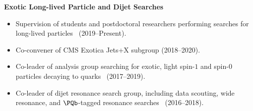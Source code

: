 \documentclass[11pt]{res}
\begin{document}
\begin{resume}
  \textbf{Exotic Long-lived Particle and Dijet Searches}
  \begin{itemize}
    \itemsep-0.3em
    \item Supervision of students and postdoctoral researchers performing searches for long-lived particles~\cite{CMS:2022wjc,CMS:2021yhb,CMS:2021juv} ({2019--Present}).
    \item Co-convener of CMS Exotica Jets+X subgroup ({2018--2020}).
    \item Co-leader of analysis group searching for exotic, light spin-$1$ and spin-$0$ particles decaying to quarks~\cite{Sirunyan:2019vxa,Sirunyan:2019sgo,Sirunyan:2018ikr,Sirunyan:2017nvi} ({2017--2019}).
    \item Co-leader of dijet resonance search group, including data scouting, wide resonance, and $\PQb$-tagged resonance searches~\cite{Sirunyan:2019pnb,Sirunyan:2019vgj,CMS-PAS-EXO-17-026,Duarte:2018bsd,Sirunyan:2018xlo,Sirunyan:2016iap} ({2016--2018}).
  \end{itemize}


\end{resume}
\end{document}

